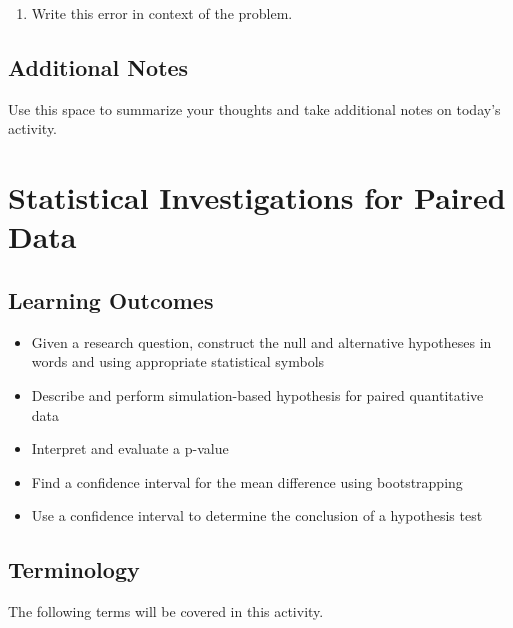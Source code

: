 \documentclass[
]{report}
\providecommand{\tightlist}{%
  \setlength{\itemsep}{0pt}\setlength{\parskip}{0pt}}
\begin{document}
\begin{enumerate}
\def\labelenumi{\arabic{enumi}.}
\setcounter{enumi}{27}
\tightlist
\item
  Write this error in context of the problem.
\end{enumerate}

\vspace{1in}

\hypertarget{additional-notes-6}{%
\section{Additional Notes}\label{additional-notes-6}}

Use this space to summarize your thoughts and take additional notes on today's activity.

\hypertarget{statistical-investigations-for-paired-data}{%
\chapter{Statistical Investigations for Paired Data}\label{statistical-investigations-for-paired-data}}

\hypertarget{learning-outcomes-3}{%
\section{Learning Outcomes}\label{learning-outcomes-3}}

\begin{itemize}
\item
  Given a research question, construct the null and alternative hypotheses
  in words and using appropriate statistical symbols
\item
  Describe and perform simulation-based hypothesis for paired quantitative data
\item
  Interpret and evaluate a p-value
\item
  Find a confidence interval for the mean difference using bootstrapping
\item
  Use a confidence interval to determine the conclusion of a hypothesis test
\end{itemize}

\hypertarget{terminology-2}{%
\section{Terminology}\label{terminology-2}}

The following terms will be covered in this activity.
\end{document}
